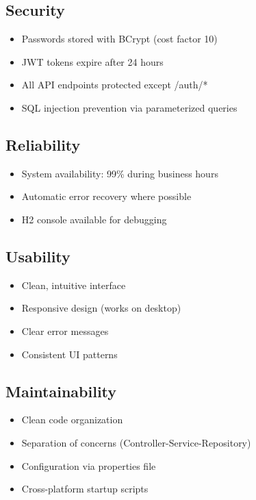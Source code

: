 \documentclass[12pt,a4paper,twoside]{book}
\begin{document}
\subsection{Security}
\begin{itemize}
    \item Passwords stored with BCrypt (cost factor 10)
    \item JWT tokens expire after 24 hours
    \item All API endpoints protected except /auth/*
    \item SQL injection prevention via parameterized queries
\end{itemize}

\subsection{Reliability}
\begin{itemize}
    \item System availability: 99\% during business hours
    \item Automatic error recovery where possible
    \item H2 console available for debugging
\end{itemize}

\subsection{Usability}
\begin{itemize}
    \item Clean, intuitive interface
    \item Responsive design (works on desktop)
    \item Clear error messages
    \item Consistent UI patterns
\end{itemize}

\subsection{Maintainability}
\begin{itemize}
    \item Clean code organization
    \item Separation of concerns (Controller-Service-Repository)
    \item Configuration via properties file
    \item Cross-platform startup scripts
\end{itemize}
\end{document}
